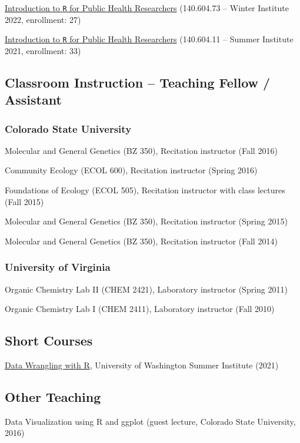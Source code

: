 \documentclass{cv}
\begin{document}
\href{https://jhudatascience.org/intro_to_R_class/}{Introduction to \texttt{R} for Public Health Researchers} (140.604.73 -- Winter Institute 2022, enrollment: 27)

\href{https://jhudatascience.org/intro_to_R_class/}{Introduction to \texttt{R} for Public Health Researchers} (140.604.11 -- Summer Institute 2021, enrollment: 33)

\subsection*{Classroom Instruction -- Teaching Fellow / Assistant}

\subsubsection*{Colorado State University}

Molecular and General Genetics (BZ 350), Recitation instructor (Fall 2016)

Community Ecology (ECOL 600), Recitation instructor (Spring 2016)

Foundations of Ecology (ECOL 505), Recitation instructor with class lectures (Fall 2015)

Molecular and General Genetics (BZ 350), Recitation instructor (Spring 2015)

Molecular and General Genetics (BZ 350), Recitation instructor (Fall 2014)

\subsubsection*{University of Virginia}

Organic Chemistry Lab II (CHEM 2421), Laboratory instructor (Spring 2011)

Organic Chemistry Lab I (CHEM 2411), Laboratory instructor (Fall 2010)

\subsection*{Short Courses}

\href{http://sisbid.github.io/Data-Wrangling/}{Data Wrangling with R}, University of Washington Summer Institute (2021)

\subsection*{Other Teaching}

Data Visualization using R and ggplot (guest lecture, Colorado State University, 2016)
\end{document}
